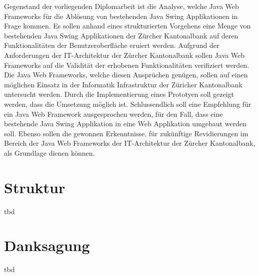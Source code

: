   Gegenstand der vorliegenden Diplomarbeit ist die Analyse, welche Java Web
  Frameworks für die Ablösung von bestehenden Java Swing Applikationen in Frage
  kommen. Es sollen anhand eines strukturierten Vorgehens eine Menge von
  bestehenden Java Swing Applikationen der Zürcher Kantonalbank auf deren
  Funktionalitäten der Benutzeroberfläche eruiert werden. Aufgrund der
  Anforderungen der IT-Architektur der Zürcher Kantonalbank sollen Java Web
  Frameworks auf die Validität der erhobenen Funktionalitäten verifiziert
  werden. Die Java Web Frameworks, welche diesen Ansprüchen genügen, sollen auf
  einen möglichen Einsatz in der Informatik Infrastruktur der Züricher
  Kantonalbank untersucht werden. Durch die Implementierung eines Prototyen
  soll gezeigt werden, dass die Umsetzung möglich ist. Schlussendlich soll eine
  Empfehlung für ein Java Web Framework ausgesprochen werden, für den Fall,
  dass eine bestehende Java Swing Applikation in eine Web Applikation umgebaut
  werden soll. Ebenso sollen die gewonnen Erkenntnisse, für zukünftige
  Revidierungen im Bereich der Java Web Frameworks der IT-Architektur der
  Zürcher Kantonalbank, als Grundlage dienen können.
  
  \section{Struktur}
  
  tbd
  
  \section{Danksagung}
  
  tbd
  